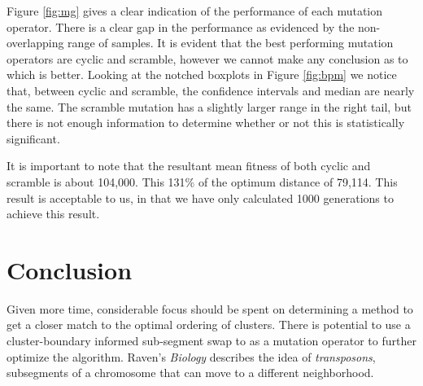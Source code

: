 \documentclass[12pt,twocolumn,oneside]{osajnl}
\begin{document}
Figure \ref{fig:mg} gives a clear indication of the performance of each mutation operator. There is a clear gap in the performance as evidenced by the non-overlapping range of samples. It is evident that the best performing mutation operators are cyclic and scramble, however we cannot make any conclusion as to which is better. Looking at the notched boxplots in Figure \ref{fig:bpm} we notice that, between cyclic and scramble, the confidence intervals and median are nearly the same. The scramble mutation has a slightly larger range in the right tail, but there is not enough information to determine whether or not this is statistically significant.

It is important to note that the resultant mean fitness of both cyclic and scramble is about 104,000. This 131\% of the optimum distance of 79,114. This result is acceptable to us, in that we have only calculated 1000 generations to achieve this result.

\section{Conclusion}
Given more time, considerable focus should be spent on determining a method to get a closer match to the optimal ordering of clusters. There is potential to use a cluster-boundary informed sub-segment swap to as a mutation operator to further optimize the algorithm. Raven's \textit{Biology}\cite{raven2001biology} describes the idea of \textit{transposons}, subsegments of a chromosome that can move to a different neighborhood.

\bigskip




\end{document}
